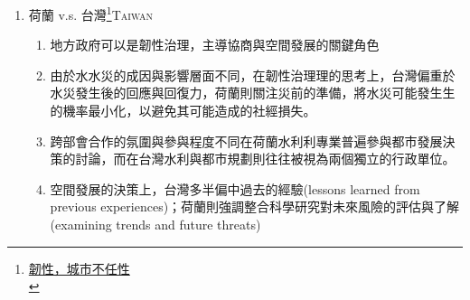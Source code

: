 \documentclass[a4paper,12pt]{article}
\begin{document}
\begin{enumerate}
\item 荷蘭 v.s. 台灣\footnote{\href{https://www.google.com/url?sa=t\&rct=j\&q=\&esrc=s\&source=web\&cd=\&cad=rja\&uact=8\&ved=2ahUKEwjp4\_b13bHvAhXULqYKHfeDBfQQFjAAegQIBhAD\&url=http\%3A\%2F\%2F140.125.48.42\%2Fyunlin\%2Fsites\%2Fdefault\%2Ffiles\%2Fdoc\%2F107nian\_du\_zai\_hai\_fang\_jiu\_ye\_wu\_ren\_yuan\_jiao\_yu\_xun\_lian\_jiang\_yi\_-dou\_liu\_chang\_.pdf\&usg=AOvVaw1s\_p9Ji8x3bST4Vcrdyu5f}{韌性，城市不任性}\\}\hfill{}\textsc{Taiwan}
\label{sec:org2ebf219}
\begin{enumerate}
\item 地方政府可以是韌性治理，主導協商與空間發展的關鍵角色\\
\item 由於⽔水災的成因與影響層⾯不同，在韌性治理理的思考上，台灣偏重於⽔災發⽣後的回應與回復⼒，荷蘭則關注災前的準備，將水災可能發⽣生的機率最小化，以避免其可能造成的社經損失。\\
\item 跨部會合作的氛圍與參與程度不同在荷蘭水利利專業普遍參與都市發展決策的討論，而在台灣⽔利與都市規劃則往往被視為兩個獨立的行政單位。\\
\item 空間發展的決策上，台灣多半偏中過去的經驗(lessons learned from previous experiences)；荷蘭則強調整合科學研究對未來風險的評估與了解(examining trends and future threats)\\
\end{enumerate}


\end{enumerate}
\end{document}
